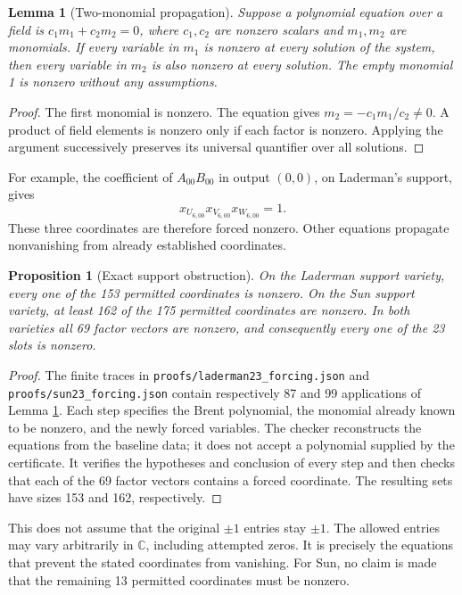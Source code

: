 \documentclass[11pt,letterpaper]{article}
\newtheorem{lemma}[theorem]{Lemma}
\newtheorem{proposition}[theorem]{Proposition}
\theoremstyle{definition}\newtheorem{definition}[theorem]{Definition}
\theoremstyle{remark}\newtheorem{remark}[theorem]{Remark}
\newcommand{\CC}{\mathbb C}\newcommand{\ZZ}{\mathbb Z}\newcommand{\QQ}{\mathbb Q}
\newcommand{\file}[1]{\nolinkurl{#1}}
\begin{document}
\begin{lemma}[Two-monomial propagation]\label{lem:forcing}
Suppose a polynomial equation over a field is
$c_1m_1+c_2m_2=0$, where $c_1,c_2$ are nonzero scalars and $m_1,m_2$ are
monomials. If every variable in $m_1$ is nonzero at every solution of the
system, then every variable in $m_2$ is also nonzero at every solution.
The empty monomial 1 is nonzero without any assumptions.
\end{lemma}
\begin{proof}
The first monomial is nonzero. The equation gives
$m_2=-c_1m_1/c_2\ne0$. A product of field elements is nonzero only if each
factor is nonzero. Applying the argument successively preserves its
universal quantifier over all solutions.
\end{proof}

For example, the coefficient of $A_{00}B_{00}$ in output $(0,0)$, on
Laderman's support, gives
\[
 x_{U_{6,00}}x_{V_{6,00}}x_{W_{6,00}}=1.
\]
These three coordinates are therefore forced nonzero. Other equations
propagate nonvanishing from already established coordinates.

\begin{proposition}[Exact support obstruction]\label{prop:support}
On the Laderman support variety, every one of the 153 permitted
coordinates is nonzero. On the Sun support variety, at least 162 of the
175 permitted coordinates are nonzero. In both varieties all 69 factor
vectors are nonzero, and consequently every one of the 23 slots is nonzero.
\end{proposition}
\begin{proof}
The finite traces in \file{proofs/laderman23_forcing.json} and
\file{proofs/sun23_forcing.json} contain respectively 87 and 99 applications
of Lemma \ref{lem:forcing}. Each step specifies the Brent polynomial, the
monomial already known to be nonzero, and the newly forced variables.
The checker reconstructs the equations from the baseline data; it does
not accept a polynomial supplied by the certificate. It verifies the
hypotheses and conclusion of every step and then checks that each of the
69 factor vectors contains a forced coordinate. The resulting sets have
sizes 153 and 162, respectively.
\end{proof}

This does not assume that the original $\pm1$ entries stay $\pm1$. The
allowed entries may vary arbitrarily in $\CC$, including attempted zeros.
It is precisely the equations that prevent the stated coordinates from
vanishing. For Sun, no claim is made that the remaining 13 permitted
coordinates must be nonzero.
\end{document}
